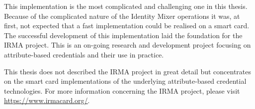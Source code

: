 This implementation is the most complicated and challenging one in this thesis.
Because of the complicated nature of the Identity Mixer operations it was, at
first, not expected that a fast implementation could be realised on a smart
card. The successful development of this implementation laid the foundation for
the IRMA project. This is an on-going research and development project focusing
on attribute-based credentials and their use in practice.

This thesis does not described the IRMA project in great detail but concentrates
on the smart card implementations of the underlying attribute-based credential
technologies. For more information concerning the IRMA project, please visit
\url{https://www.irmacard.org/}.